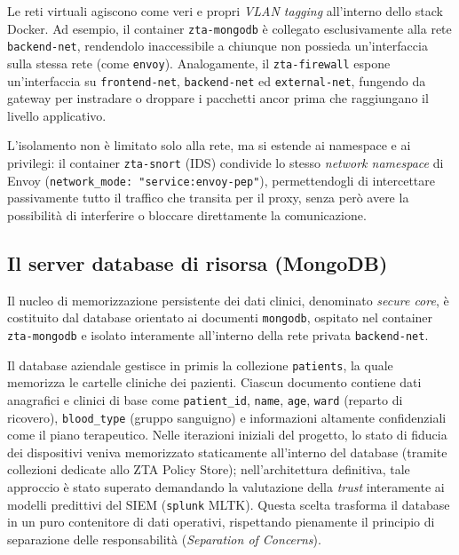 Le reti virtuali agiscono come veri e propri \textit{VLAN tagging} all'interno dello stack Docker. Ad esempio, il container \texttt{zta-mongodb} è collegato esclusivamente alla rete \texttt{backend-net}, rendendolo inaccessibile a chiunque non possieda un'interfaccia sulla stessa rete (come \texttt{envoy}). Analogamente, il \texttt{zta-firewall} espone un'interfaccia su \texttt{frontend-net}, \texttt{backend-net} ed \texttt{external-net}, fungendo da gateway per instradare o droppare i pacchetti ancor prima che raggiungano il livello applicativo.

L'isolamento non è limitato solo alla rete, ma si estende ai namespace e ai privilegi: il container \texttt{zta-snort} (IDS) condivide lo stesso \textit{network namespace} di Envoy (\texttt{network\_mode: "service:envoy-pep"}), permettendogli di intercettare passivamente tutto il traffico che transita per il proxy, senza però avere la possibilità di interferire o bloccare direttamente la comunicazione.

\subsection{Il server database di risorsa (MongoDB)}
Il nucleo di memorizzazione persistente dei dati clinici, denominato \textit{secure core}, è costituito dal database orientato ai documenti \texttt{mongodb}, ospitato nel container \texttt{zta-mongodb} e isolato interamente all'interno della rete privata \texttt{backend-net}. 

Il database aziendale gestisce in primis la collezione \texttt{patients}, la quale memorizza le cartelle cliniche dei pazienti. Ciascun documento contiene dati anagrafici e clinici di base come \texttt{patient\_id}, \texttt{name}, \texttt{age}, \texttt{ward} (reparto di ricovero), \texttt{blood\_type} (gruppo sanguigno) e informazioni altamente confidenziali come il piano terapeutico. Nelle iterazioni iniziali del progetto, lo stato di fiducia dei dispositivi veniva memorizzato staticamente all'interno del database (tramite collezioni dedicate allo ZTA Policy Store); nell'architettura definitiva, tale approccio è stato superato demandando la valutazione della \textit{trust} interamente ai modelli predittivi del SIEM (\texttt{splunk} MLTK). Questa scelta trasforma il database in un puro contenitore di dati operativi, rispettando pienamente il principio di separazione delle responsabilità (\textit{Separation of Concerns}).

